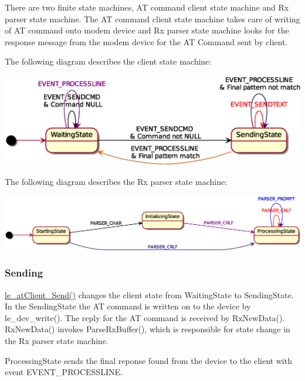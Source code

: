 There are two finite state machines, AT command client state machine and Rx parser state machine. The AT command client state machine takes care of writing of AT command onto modem device and Rx parser state machine looks for the response message from the modem device for the AT Command sent by client.

The following diagram describes the client state machine\+:


\begin{DoxyImageNoCaption}
  \mbox{\includegraphics[width=\textwidth,height=\textheight/2,keepaspectratio=true]{client_state_machine}}
\end{DoxyImageNoCaption}


The following diagram describes the Rx parser state machine\+:


\begin{DoxyImageNoCaption}
  \mbox{\includegraphics[width=\textwidth,height=\textheight/2,keepaspectratio=true]{Rx_parser_state_machine}}
\end{DoxyImageNoCaption}
\hypertarget{c_SDD_atClient_atClient_send}{}\subsubsection{Sending}\label{c_SDD_atClient_atClient_send}
\hyperlink{le__at_client__interface_8h_aaf39cf9ae5ffb4c76a6eefc8be030e7c}{le\+\_\+at\+Client\+\_\+\+Send()} changes the client state from Waiting\+State to Sending\+State. In the Sending\+State the AT command is written on to the device by le\+\_\+dev\+\_\+write(). The reply for the AT command is received by Rx\+New\+Data(). Rx\+New\+Data() invokes Parse\+Rx\+Buffer(), which is responsible for state change in the Rx parser state machine.

Processing\+State sends the final reponse found from the device to the client with event E\+V\+E\+N\+T\+\_\+\+P\+R\+O\+C\+E\+S\+S\+L\+I\+NE.

